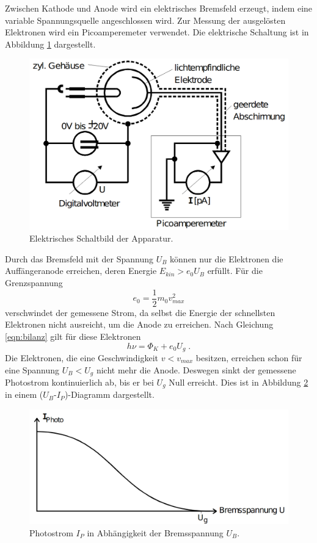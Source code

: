 \noindent
Zwischen Kathode und Anode wird ein elektrisches Bremsfeld erzeugt, indem eine variable Spannungsquelle angeschlossen wird. Zur Messung der
ausgelösten Elektronen wird ein Picoamperemeter verwendet. Die elektrische Schaltung ist in Abbildung \ref{fig:Schaltung} dargestellt.
\begin{figure}
    \centering
    \includegraphics[scale=0.3]{pictures/ElektischeSchaltung.png}
    \caption{Elektrisches Schaltbild der Apparatur. \cite{AP01}}
    \label{fig:Schaltung}
\end{figure}

\noindent
Durch das Bremsfeld mit der Spannung $U_B$ können nur die Elektronen die Auffängeranode erreichen, deren Energie $E_{kin}>e_0U_B$ erfüllt.
Für die Grenzspannung
\begin{equation}
    e_0=\frac{1}{2}m_0v_{max}^2
\end{equation}
verschwindet der gemessene Strom, da selbst die Energie der schnellsten Elektronen nicht ausreicht, um die Anode zu erreichen. Nach
Gleichung \eqref{eqn:bilanz} gilt für diese Elektronen
\begin{equation}
    h\nu=\Phi_K+e_0U_g\;.
\end{equation}
Die Elektronen, die eine Geschwindigkeit $v<v_{max}$ besitzen, erreichen schon für eine Spannung $U_B<U_g$ nicht mehr die Anode. Deswegen
sinkt der gemessene Photostrom kontinuierlich ab, bis er bei $U_g$ Null erreicht. Dies ist in Abbildung \ref{fig:Photostrom} in einem
($U_B$-$I_P$)-Diagramm dargestellt.

\begin{figure}
    \centering
    \includegraphics[scale=0.3]{pictures/Photostrom.png}
    \caption{Photostrom $I_{P}$ in Abhängigkeit der Bremsspannung $U_B$. \cite{AP01}}
    \label{fig:Photostrom}
\end{figure}

